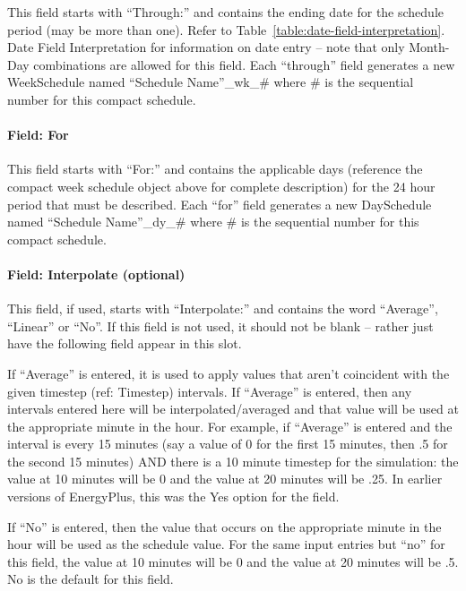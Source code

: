 This field starts with ``Through:'' and contains the ending date for the schedule period (may be more than one). Refer to Table~\ref{table:date-field-interpretation}. Date Field Interpretation for information on date entry -- note that only Month-Day combinations are allowed for this field. Each ``through'' field generates a new WeekSchedule named ``Schedule Name''\_wk\_\# where \# is the sequential number for this compact schedule.

\paragraph{Field: For}\label{field-for}

This field starts with ``For:'' and contains the applicable days (reference the compact week schedule object above for complete description) for the 24 hour period that must be described. Each ``for'' field generates a new DaySchedule named ``Schedule Name''\_dy\_\# where \# is the sequential number for this compact schedule.

\paragraph{Field: Interpolate (optional)}\label{field-interpolate-optional}

This field, if used, starts with ``Interpolate:'' and contains the word ``Average'', ``Linear'' or ``No''. If this field is not used, it should not be blank -- rather just have the following field appear in this slot.

If ``Average'' is entered, it is used to apply values that aren't coincident with the given timestep (ref: Timestep) intervals. If ``Average'' is entered, then any intervals entered here will be interpolated/averaged and that value will be used at the appropriate minute in the hour. For example, if ``Average'' is entered and the interval is every 15 minutes (say a value of 0 for the first 15 minutes, then .5 for the second 15 minutes) AND there is a 10 minute timestep for the simulation: the value at 10 minutes will be 0 and the value at 20 minutes will be .25. In earlier versions of EnergyPlus, this was the Yes option for the field.

If ``No'' is entered, then the value that occurs on the appropriate minute in the hour will be used as the schedule value. For the same input entries but ``no'' for this field, the value at 10 minutes will be 0 and the value at 20 minutes will be .5. No is the default for this field.

